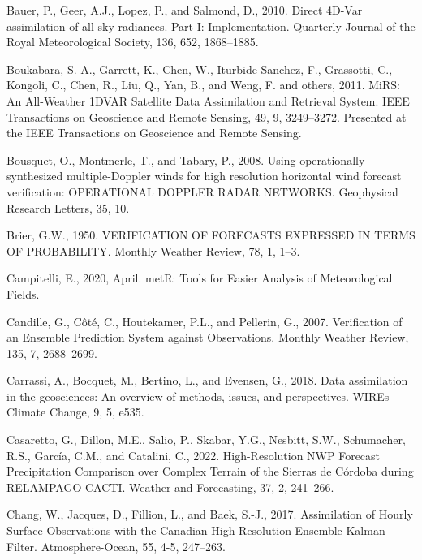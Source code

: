\documentclass[12pt,oneside,a4paper]{reedthesis}
\begin{document}
\leavevmode\hypertarget{ref-bauer2010}{}%
Bauer, P., Geer, A.J., Lopez, P., and Salmond, D., 2010. Direct 4D-Var assimilation of all-sky radiances. Part I: Implementation. Quarterly Journal of the Royal Meteorological Society, 136, 652, 1868--1885.

\leavevmode\hypertarget{ref-boukabara2011}{}%
Boukabara, S.-A., Garrett, K., Chen, W., Iturbide-Sanchez, F., Grassotti, C., Kongoli, C., Chen, R., Liu, Q., Yan, B., and Weng, F. and others, 2011. MiRS: An All-Weather 1DVAR Satellite Data Assimilation and Retrieval System. IEEE Transactions on Geoscience and Remote Sensing, 49, 9, 3249--3272. Presented at the IEEE Transactions on Geoscience and Remote Sensing.

\leavevmode\hypertarget{ref-bousquet2008}{}%
Bousquet, O., Montmerle, T., and Tabary, P., 2008. Using operationally synthesized multiple-Doppler winds for high resolution horizontal wind forecast verification: OPERATIONAL DOPPLER RADAR NETWORKS. Geophysical Research Letters, 35, 10.

\leavevmode\hypertarget{ref-brier1950}{}%
Brier, G.W., 1950. VERIFICATION OF FORECASTS EXPRESSED IN TERMS OF PROBABILITY. Monthly Weather Review, 78, 1, 1--3.

\leavevmode\hypertarget{ref-campitelli2020}{}%
Campitelli, E., 2020, April. metR: Tools for Easier Analysis of Meteorological Fields.

\leavevmode\hypertarget{ref-candille2007}{}%
Candille, G., Côté, C., Houtekamer, P.L., and Pellerin, G., 2007. Verification of an Ensemble Prediction System against Observations. Monthly Weather Review, 135, 7, 2688--2699.

\leavevmode\hypertarget{ref-carrassi2018}{}%
Carrassi, A., Bocquet, M., Bertino, L., and Evensen, G., 2018. Data assimilation in the geosciences: An overview of methods, issues, and perspectives. WIREs Climate Change, 9, 5, e535.

\leavevmode\hypertarget{ref-casaretto2022}{}%
Casaretto, G., Dillon, M.E., Salio, P., Skabar, Y.G., Nesbitt, S.W., Schumacher, R.S., García, C.M., and Catalini, C., 2022. High-Resolution NWP Forecast Precipitation Comparison over Complex Terrain of the Sierras de Córdoba during RELAMPAGO-CACTI. Weather and Forecasting, 37, 2, 241--266.

\leavevmode\hypertarget{ref-chang2017}{}%
Chang, W., Jacques, D., Fillion, L., and Baek, S.-J., 2017. Assimilation of Hourly Surface Observations with the Canadian High-Resolution Ensemble Kalman Filter. Atmosphere-Ocean, 55, 4-5, 247--263.
\end{document}
